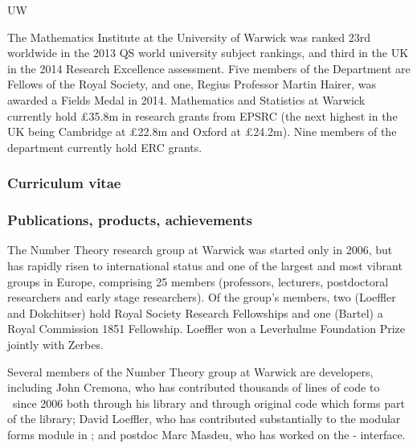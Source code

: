 \begin{sitedescription}{UW}

The Mathematics Institute at the University of Warwick was ranked 23rd
worldwide in the 2013 QS world university subject rankings, and third in
the UK in the 2014 Research Excellence assessment.  Five
members of the Department are Fellows of the Royal Society, and one,
Regius Professor Martin Hairer, was awarded a Fields Medal in 2014.
Mathematics and Statistics at Warwick currently hold \pounds 35.8m in
research grants from EPSRC (the next highest in the UK being Cambridge
at \pounds 22.8m and Oxford at \pounds 24.2m).  Nine members of the department
currently hold ERC grants.



\subsubsection*{Curriculum vitae}




%
%

\subsubsection*{Publications, products, achievements}
\begin{compactenum}
\item
The Number Theory research group at Warwick was started only in 2006,
but has rapidly risen to international status and one of the largest
and most vibrant groups in Europe, comprising 25 members (professors,
lecturers, postdoctoral researchers and early stage researchers).  Of
the group's members, two (Loeffler and Dokchitser) hold Royal Society
Research Fellowships and one (Bartel) a Royal Commission 1851
Fellowship.  Loeffler won a Leverhulme Foundation Prize jointly with
Zerbes.
\item
Several members of the Number Theory group at Warwick are \Sage
developers, including John Cremona, who has contributed thousands of
lines of code to \Sage\ since 2006 both through his  
library and through original \Python code which forms part of the
\Sage library; David Loeffler, who has contributed substantially to
the modular forms module in \Sage; and postdoc Marc Masdeu, who has
worked on the \Sage- interface.
\end{compactenum}


\end{sitedescription}
